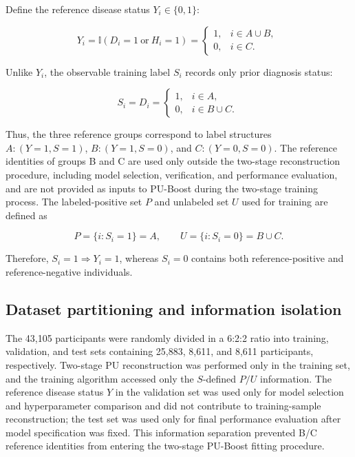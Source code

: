 \documentclass[10pt]{article}
\begin{document}
Define the reference disease status \(Y_{i} \in \{ 0,1\}\):

\[Y_{i}= \mathbb{I}\left( D_{i} = 1\ \text{or}\ H_{i} = 1 \right) = \left\{ \begin{matrix}
1, & i \in A \cup B, \\
0, & i \in C.
\end{matrix} \right.\ \]

Unlike \(Y_{i}\), the observable training label \(S_{i}\) records only
prior diagnosis status:

\[S_{i} = D_{i} = \left\{ \begin{matrix}
1, & i \in A, \\
0, & i \in B \cup C.
\end{matrix} \right.\ \]

Thus, the three reference groups correspond to label structures
\(A:(Y = 1,S = 1)\), \(B:(Y = 1,S = 0)\), and \(C:(Y = 0,S = 0)\). The
reference identities of groups B and C are used only outside the
two-stage reconstruction procedure, including model selection,
verification, and performance evaluation, and are not provided as inputs
to PU-Boost during the two-stage training process. The labeled-positive
set \(P\) and unlabeled set \(U\) used for training are defined as

\[P = \{ i:S_{i} = 1\} = A,\quad\quad U = \{ i:S_{i} = 0\} = B \cup C.\]

Therefore, \(S_{i} = 1 \Rightarrow Y_{i} = 1\), whereas \(S_{i} = 0\)
contains both reference-positive and reference-negative individuals.

\subsection{Dataset partitioning and information
isolation}\label{dataset-partitioning-and-information-isolation}

The 43,105 participants were randomly divided in a 6:2:2 ratio into
training, validation, and test sets containing 25,883, 8,611, and 8,611
participants, respectively. Two-stage PU reconstruction was performed
only in the training set, and the training algorithm accessed only the
\(S\)-defined \(P/U\) information. The reference disease status \(Y\) in
the validation set was used only for model selection and hyperparameter
comparison and did not contribute to training-sample reconstruction; the
test set was used only for final performance evaluation after model
specification was fixed. This information separation prevented B/C
reference identities from entering the two-stage PU-Boost fitting
procedure.
\end{document}
